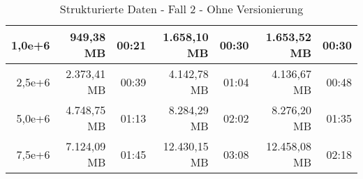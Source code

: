 \begin{table}
\begin{tabular}{|r|r|r|r|r|r|r|}
        1,0e+6          & 949,38 MB           & 00:21           & 1.658,10 MB         & 00:30           & 1.653,52 MB         & 00:30           \\ \hline
        2,5e+6          & 2.373,41 MB         & 00:39           & 4.142,78 MB         & 01:04           & 4.136,67 MB         & 00:48           \\ \hline
        5,0e+6          & 4.748,75 MB         & 01:13           & 8.284,29 MB         & 02:02           & 8.276,20 MB         & 01:35           \\ \hline
        7,5e+6          & 7.124,09 MB         & 01:45           & 12.430,15 MB        & 03:08           & 12.458,08 MB        & 02:18           \\ \hline
    \end{tabular}
    \caption{Strukturierte Daten - Fall 2 - Ohne Versionierung}
\end{table}

